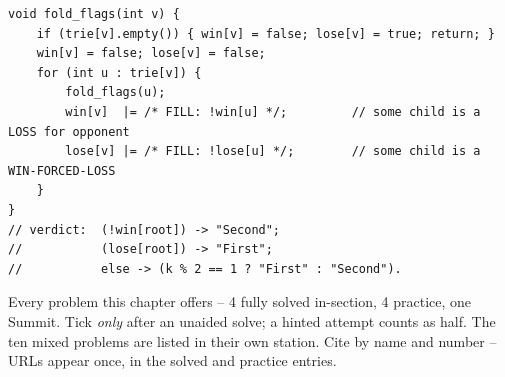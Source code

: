 \begin{lstlisting}[caption={Drill 5 -- two-flag trie DP (from \coderef{c27-455b-soln})}]
void fold_flags(int v) {
    if (trie[v].empty()) { win[v] = false; lose[v] = true; return; }
    win[v] = false; lose[v] = false;
    for (int u : trie[v]) {
        fold_flags(u);
        win[v]  |= /* FILL: !win[u] */;         // some child is a LOSS for opponent
        lose[v] |= /* FILL: !lose[u] */;        // some child is a WIN-FORCED-LOSS
    }
}
// verdict:  (!win[root]) -> "Second";
//           (lose[root]) -> "First";
//           else -> (k % 2 == 1 ? "First" : "Second").
\end{lstlisting}


Every problem this chapter offers -- 4 fully solved in-section, 4
practice, one Summit. Tick \emph{only} after an unaided solve; a hinted
attempt counts as half. The ten mixed problems are listed in their own
station. Cite by name and number -- URLs appear once, in the solved and
practice entries.


